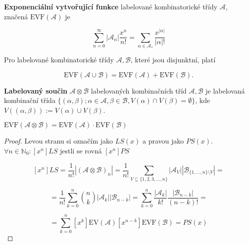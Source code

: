 \begin{definice}
	\textbf{Exponenciální vytvořující funkce} labelované kombinatorické třídy $\mathcal{A}$, značená $\text{EVF}(\mathcal{A})$ je
	
	$$
	\sum_{n=0}^{\infty}|\mathcal{A}_{n}|\frac{x^{n}}{n!} = \sum_{\alpha \in \mathcal{A}_{\ast}} \frac{x^{|\alpha|}}{|\alpha|!}
	$$
\end{definice}

\begin{pozor}
	Pro labelované kombinatorické třídy $\mathcal{A}, \mathcal{B}$, které jsou disjunktní, platí
	
	$$
	\text{EVF}(\mathcal{A} \cup \mathcal{B}) = \text{EVF}(\mathcal{A}) + \text{EVF}(\mathcal{B}).
	$$
\end{pozor}

\begin{definice}
	\textbf{Labelovaný součin} $\mathcal{A} \otimes \mathcal{B}$ labelovaných kombinačních tříd $\mathcal{A}, \mathcal{B}$ je labelovaná kombinační třída $\{(\alpha, \beta); \alpha \in \mathcal{A}, \beta \in \mathcal{B}, V(\alpha) \cap V(\beta) = \emptyset\}$, kde $V((\alpha, \beta)) := V(\alpha) \cup V(\beta)$.
\end{definice}

\begin{tvrz}
	$\text{EVF}(\mathcal{A} \otimes \mathcal{B}) = \text{EVF}(\mathcal{A}) \cdot \text{EVF}(\mathcal{B})$
\end{tvrz}

\begin{proof}
	Levou stranu si označím jako $LS(x)$ a pravou jako $PS(x)$. $\forall n \in \mathbb{N}_{0}: [x^{n}] LS$ jestli se rovná $[x^{n}] PS$
	
	$$
	[x^{n}]LS = \frac{1}{n!} |(\mathcal{A} \otimes \mathcal{B})_{n}| = \frac{1}{n!} \sum_{V \subseteq \{1,2,3, \dots ,n\}} |\mathcal{A}_{V}| |\mathcal{B}_{\{1,\dots,n\} \setminus V}| =
	$$
	
	$$
	= \frac{1}{n!} \sum_{k=0}^{n} \binom{n}{k} |\mathcal{A}_{k}| |\mathcal{B}_{n-k}| = \sum_{k = 0}^{n} \frac{|\mathcal{A}_{k}|}{k!} \frac{|\mathcal{B}_{n-k}|}{(n-k)!} =
	$$
	
	$$
	= \sum_{k=0}^{n} [x^{k}]\text{EV}(\mathcal{A})[x^{n-k}]\text{EVF}(\mathcal{B}) = PS(x)
	$$
\end{proof}
